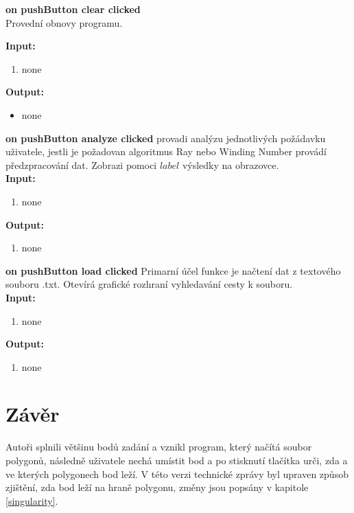 \documentclass{article}
\begin{document}
\bigskip 

\textbf{on pushButton clear clicked} 
\\
Provední obnovy programu. 

\bigskip 
 \textbf{Input:}
\begin{enumerate} 
\item none
\end{enumerate}
\bigskip
 \textbf{Output:}
\begin{itemize} 
\item none
\end{itemize}


\bigskip 


\textbf{on pushButton analyze clicked} provadi analýzu jednotlivých požádavku uživatele, jestli je požadovan algoritmus Ray nebo Winding Number provádí předzpracování dat. Zobrazi pomoci $label$ výsledky na obrazovce.\\ 

\bigskip 
 \textbf{Input:}
\begin{enumerate} 
\item none
\end{enumerate}
\bigskip
 \textbf{Output:}
\begin{enumerate} 
\item none
\end{enumerate}

\bigskip 

\textbf{on pushButton load clicked} Primarní účel funkce je načtení dat z textového souboru .txt. Otevírá grafické rozhraní vyhledavání cesty k souboru.\\ 

\bigskip 
 \textbf{Input:}
\begin{enumerate} 
\item none
\end{enumerate}
\bigskip
 \textbf{Output:}
\begin{enumerate} 
\item none
\end{enumerate} 

\newpage 

 

\section{Závěr}
\indent Autoři splnili většinu bodů zadání a vznikl program, který načítá soubor polygonů, následně uživatele nechá umístit bod a po stisknutí tlačítka urči, zda a ve kterých polygonech bod leží. 
V této verzi technické zprávy byl upraven způsob zjištění, zda bod leží na hraně polygonu, změny jsou popsány v kapitole \ref{singularity}.
\end{document}
